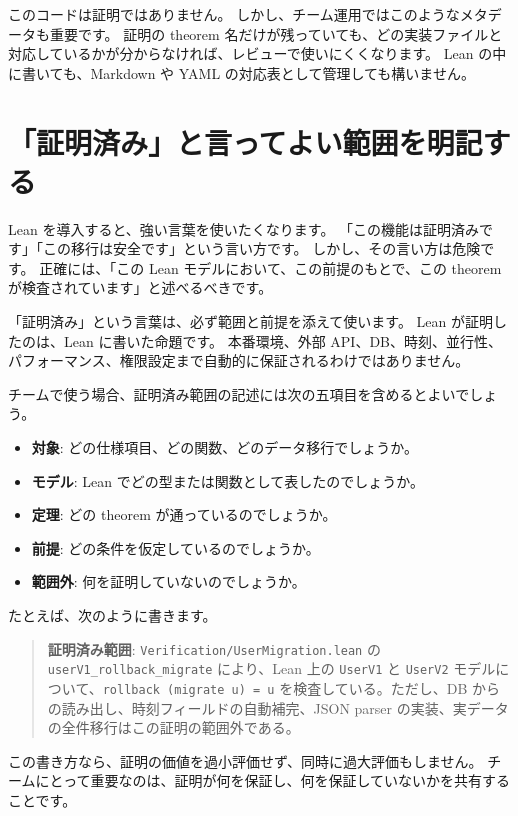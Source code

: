 このコードは証明ではありません。
しかし、チーム運用ではこのようなメタデータも重要です。
証明の theorem 名だけが残っていても、どの実装ファイルと対応しているかが分からなければ、レビューで使いにくくなります。
Lean の中に書いても、Markdown や YAML の対応表として管理しても構いません。

\section{「証明済み」と言ってよい範囲を明記する}

Lean を導入すると、強い言葉を使いたくなります。
「この機能は証明済みです」「この移行は安全です」という言い方です。
しかし、その言い方は危険です。
正確には、「この Lean モデルにおいて、この前提のもとで、この theorem が検査されています」と述べるべきです。

「証明済み」という言葉は、必ず範囲と前提を添えて使います。
Lean が証明したのは、Lean に書いた命題です。
本番環境、外部 API、DB、時刻、並行性、パフォーマンス、権限設定まで自動的に保証されるわけではありません。

チームで使う場合、証明済み範囲の記述には次の五項目を含めるとよいでしょう。

\begin{itemize}
\item \textbf{対象}: どの仕様項目、どの関数、どのデータ移行でしょうか。
\item \textbf{モデル}: Lean でどの型または関数として表したのでしょうか。
\item \textbf{定理}: どの theorem が通っているのでしょうか。
\item \textbf{前提}: どの条件を仮定しているのでしょうか。
\item \textbf{範囲外}: 何を証明していないのでしょうか。
\end{itemize}

たとえば、次のように書きます。

\begin{quote}
\textbf{証明済み範囲}: \texttt{Verification/UserMigration.lean} の \texttt{userV1\_rollback\_migrate} により、Lean 上の \texttt{UserV1} と \texttt{UserV2} モデルについて、\texttt{rollback (migrate u) = u} を検査している。ただし、DB からの読み出し、時刻フィールドの自動補完、JSON parser の実装、実データの全件移行はこの証明の範囲外である。
\end{quote}

この書き方なら、証明の価値を過小評価せず、同時に過大評価もしません。
チームにとって重要なのは、証明が何を保証し、何を保証していないかを共有することです。

